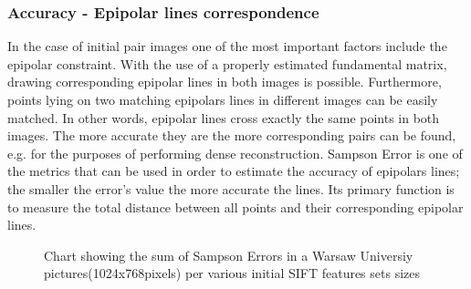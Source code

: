 \subsubsection{Accuracy - Epipolar lines correspondence}
In the case of initial pair images one of the most important factors include the epipolar constraint. With the use of a properly estimated fundamental matrix, drawing corresponding epipolar lines in both images is possible. Furthermore, points lying on two matching epipolars lines in different images can be easily matched. In other words, epipolar lines cross exactly the same points in both images. The more accurate they are the more corresponding pairs can be found, e.g. for the purposes of performing dense reconstruction. Sampson Error is one of the metrics that can be used in order to estimate the accuracy of epipolars lines; the smaller the error's value the more accurate the lines. Its primary function is to measure the total distance between all points and their corresponding epipolar lines.\\
\begin{figure}[b!]
  \begin{center}
    \caption[Sum of Sampson Error depending on evaluated method]{Chart showing the sum of Sampson Errors in a Warsaw Universiy pictures(1024x768pixels) per various initial SIFT features sets sizes}
    \label{plot:TotalSampsonError}
  \end{center}
\end{figure}
